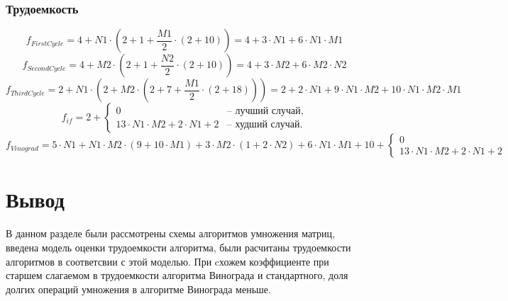    \subsubsection*{Трудоемкость}
    \begin{equation}
    f_{FirstCycle} = 4 + N1 \cdot (2+ 1 + \frac{M1}{2} \cdot (2 + 10)) = 4 + 3\cdot N1 + 6\cdot N1 \cdot M1 
    \end{equation}
    \begin{equation}
    f_{SecondCycle} = 4 + M2 \cdot (2+ 1 + \frac{N2}{2} \cdot (2 + 10)) = 4 + 3\cdot M2 + 6\cdot M2 \cdot N2 
    \end{equation}
    \begin{equation}
    f_{ThirdCycle} = 2 + N1 \cdot (2+ M2 \cdot (2 + 7 + \frac{M1} {2} \cdot (2 + 18))) = 2 + 2 \cdot N1 + 9 \cdot N1 \cdot M2 + 10 \cdot N1 \cdot M2 \cdot M1
    \end{equation}
    \begin{equation}
    f_{if}= 2 + \begin{cases}
            0 &\text{-- лучший случай},\\
            13 \cdot N1 \cdot M2 + 2 \cdot N1 + 2 &\text{-- худший случай}.  
    \end{cases}
    \end{equation}
    \begin{equation}
    f_{Vinograd} = 5 \cdot N1 + N1 \cdot M2 \cdot( 9 + 10 \cdot M1) + 3\cdot M2 \cdot (1 + 2\cdot N2) + 6\cdot N1 \cdot M1 + 10 +
    \begin{cases}
            0 \\
            13 \cdot N1 \cdot M2 + 2 \cdot N1 + 2  
    \end{cases}
    \end{equation}

	\section*{Вывод}
    \par В данном разделе были рассмотрены схемы алгоритмов умножения матриц, введена модель оценки трудоемкости алгоритма, были расчитаны трудоемкости алгоритмов в соответсвии с этой моделью. При cхожем коэффициенте при старшем слагаемом в трудоемкости алгоритма Винограда и стандартного, доля долгих операций умножения в алгоритме Винограда меньше.
\newpage